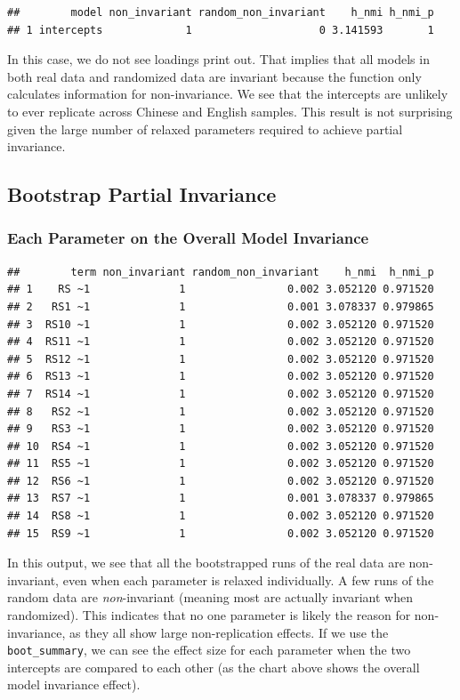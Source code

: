 \documentclass[
  man,floatsintext]{apa7}
\begin{document}
\begin{verbatim}
##        model non_invariant random_non_invariant    h_nmi h_nmi_p
## 1 intercepts             1                    0 3.141593       1
\end{verbatim}

In this case, we do not see loadings print out. That implies that all models in both real data and randomized data are invariant because the function only calculates information for non-invariance. We see that the intercepts are unlikely to ever replicate across Chinese and English samples. This result is not surprising given the large number of relaxed parameters required to achieve partial invariance.

\subsection{Bootstrap Partial Invariance}\label{bootstrap-partial-invariance}

\subsubsection{Each Parameter on the Overall Model Invariance}\label{each-parameter-on-the-overall-model-invariance}

\begin{verbatim}
##        term non_invariant random_non_invariant    h_nmi  h_nmi_p
## 1    RS ~1              1                0.002 3.052120 0.971520
## 2   RS1 ~1              1                0.001 3.078337 0.979865
## 3  RS10 ~1              1                0.002 3.052120 0.971520
## 4  RS11 ~1              1                0.002 3.052120 0.971520
## 5  RS12 ~1              1                0.002 3.052120 0.971520
## 6  RS13 ~1              1                0.002 3.052120 0.971520
## 7  RS14 ~1              1                0.002 3.052120 0.971520
## 8   RS2 ~1              1                0.002 3.052120 0.971520
## 9   RS3 ~1              1                0.002 3.052120 0.971520
## 10  RS4 ~1              1                0.002 3.052120 0.971520
## 11  RS5 ~1              1                0.002 3.052120 0.971520
## 12  RS6 ~1              1                0.002 3.052120 0.971520
## 13  RS7 ~1              1                0.001 3.078337 0.979865
## 14  RS8 ~1              1                0.002 3.052120 0.971520
## 15  RS9 ~1              1                0.002 3.052120 0.971520
\end{verbatim}

In this output, we see that all the bootstrapped runs of the real data are non-invariant, even when each parameter is relaxed individually. A few runs of the random data are \emph{non}-invariant (meaning most are actually invariant when randomized). This indicates that no one parameter is likely the reason for non-invariance, as they all show large non-replication effects. If we use the \texttt{boot\_summary}, we can see the effect size for each parameter when the two intercepts are compared to each other (as the chart above shows the overall model invariance effect).
\end{document}
